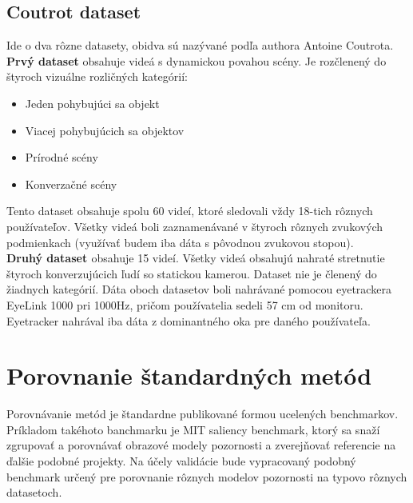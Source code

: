 \subsection{Coutrot dataset}
Ide o dva rôzne datasety, obidva sú nazývané podľa authora Antoine Coutrota.
\textbf{Prvý dataset\cite{sound-1}} obsahuje videá s dynamickou povahou scény.
Je rozčlenený do štyroch vizuálne rozličných kategórií:
\begin{itemize}
  \item Jeden pohybujúci sa objekt
  \item Viacej pohybujúcich sa objektov
  \item Prírodné scény
  \item Konverzačné scény
\end{itemize}
Tento dataset obsahuje spolu 60 videí, ktoré sledovali vždy 18-tich rôznych používateľov.
Všetky videá boli zaznamenávané v štyroch rôznych zvukových podmienkach (využívať budem iba dáta s pôvodnou zvukovou stopou). \\
\textbf{Druhý dataset \cite{coutrot-database-2}} obsahuje 15 videí.
Všetky videá obsahujú nahraté stretnutie štyroch konverzujúcich ľudí so statickou kamerou.
Dataset nie je členený do žiadnych kategórií.
Dáta oboch datasetov boli nahrávané pomocou eyetrackera EyeLink 1000 pri 1000Hz, pričom používatelia sedeli 57 cm od monitoru.
Eyetracker nahrával iba dáta z dominantného oka pre daného používateľa.

\section{Porovnanie štandardných metód}
Porovnávanie metód je štandardne publikované formou ucelených benchmarkov.
Príkladom takéhoto banchmarku je MIT saliency benchmark\cite{mit-saliency-benchmark}, ktorý sa snaží zgrupovať a porovnávať obrazové modely pozornosti a zverejňovať referencie na ďalšie podobné projekty.
Na účely validácie bude vypracovaný podobný benchmark určený pre porovnanie rôznych modelov pozornosti na typovo rôznych datasetoch.
